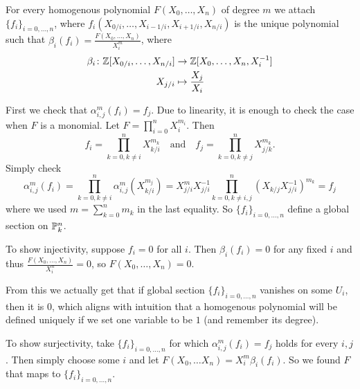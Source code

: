 \begin{exercise}{2}
    For every homogenous polynomial $F(X_0, \dots, X_n)$ of degree $m$ we attach
    $\{f_i\}_{i=0,\dots,n}$, where $f_i(X_{0/i}, \dots, X_{i-1/i}, X_{i+1/i},
    X_{n/i})$ is the unique polynomial such that $\beta_i(f_i) = \frac{F(X_0,
    \dots, X_n)}{X^m_i}$, where
    \begin{align*}
        \beta_i \colon \mathbb{Z}[X_{0/i}, \dots, X_{n/i}] &\to \mathbb{Z}[X_0, \dots, X_n,
        X^{-1}_i] \\
        X_{j/i} &\mapsto \frac{X_j}{X_i}
    \end{align*}
    
    First we check that $\alpha^m_{i, j} (f_i) = f_j$. Due to linearity, it is
    enough to check the case when $F$ is a monomial. Let $F = \prod^n_{i = 0}
    X^{m_i}_i$. Then
    \begin{equation*}
        f_i = \prod^n_{k = 0, k \not= i} X^{m_k}_{k/i} \quad\text{and}\quad f_j
        = \prod^n_{k = 0, k \not= j} X^{m_k}_{j/k}.
    \end{equation*}
    Simply check
    \begin{equation*}
        \alpha^m_{i, j} (f_i) =
        \prod^n_{k = 0, k \not= i} \alpha^m_{i, j} (X^{m_j}_{k/i}) =
        X^m_{j/i} X^{-1}_{j/i} \prod^n_{k = 0, k \not= i, j} (X_{k/j}
        X^{-1}_{j/i})^{m_k} = f_j
    \end{equation*}
    where we used $m = \sum^n_{k=0} m_k$ in the last equality.
    So $\{f_i\}_{i = 0, \dots, n}$ define a global section on $\mathbb{P}^n_k$.

    To show injectivity, suppose $f_i = 0$ for all $i$. Then $\beta_i(f_i) = 0$
    for any fixed $i$ and thus $\frac{F(X_0, \dots, X_n)}{X^n_i} = 0$, so
    $F(X_0, \dots, X_n) = 0$.

    From this we actually get that if global section $\{f_i\}_{i = 0, \dots, n}$
    vanishes on some $U_i$, then it is $0$, which aligns with intuition that a
    homogenous polynomial will be defined uniquely if we set one variable to be
    $1$ (and remember its degree).

    To show surjectivity, take $\{f_i\}_{i = 0, \dots, n}$ for which
    $\alpha^m_{i, j} (f_i) = f_j$ holds for every $i, j$. Then simply choose
    some $i$ and let $F(X_0, \dots X_n) = X^m_i \beta_i(f_i)$. So we found $F$
    that maps to $\{f_i\}_{i = 0, \dots, n}$.

\end{exercise}


